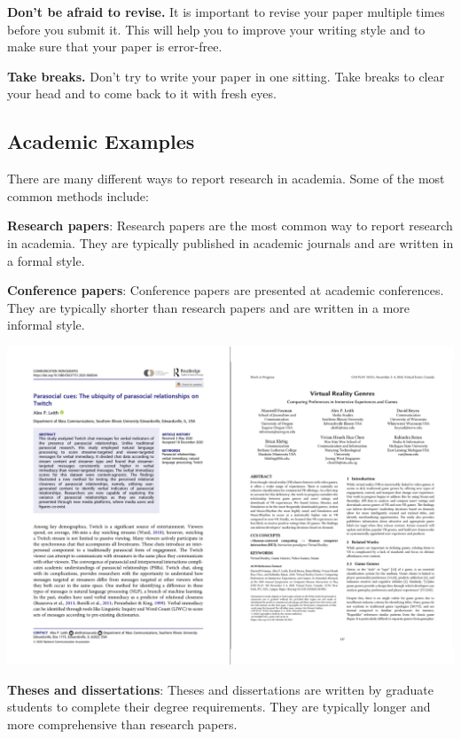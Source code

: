 \documentclass[
  b5paper]{book}
\begin{document}
\textbf{Don't be afraid to revise.} It is important to revise your paper multiple times before you submit it. This will help you to improve your writing style and to make sure that your paper is error-free.

\textbf{Take breaks.} Don't try to write your paper in one sitting. Take breaks to clear your head and to come back to it with fresh eyes.

\hypertarget{academic-examples}{%
\subsection*{Academic Examples}\label{academic-examples}}

There are many different ways to report research in academia. Some of the most common methods include:

\textbf{Research papers}: Research papers are the most common way to report research in academia. They are typically published in academic journals and are written in a formal style.

\textbf{Conference papers}: Conference papers are presented at academic conferences. They are typically shorter than research papers and are written in a more informal style.

\includegraphics[width=1\textwidth,height=\textheight]{images/papers.png}

\textbf{Theses and dissertations}: Theses and dissertations are written by graduate students to complete their degree requirements. They are typically longer and more comprehensive than research papers.
\end{document}
